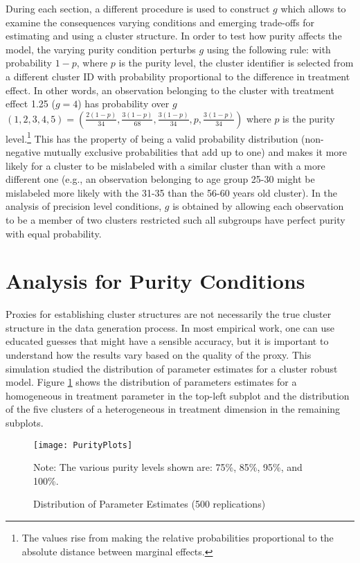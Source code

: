 \documentclass{jbsc}
\begin{document}
During each section, a different procedure is used to construct $g$ which allows to examine the consequences varying conditions and emerging trade-offs for estimating and using a cluster structure. In order to test how purity affects the model, the varying purity condition perturbs $g$ using the following rule: with probability $1 - p$, where $p$ is the purity level, the cluster identifier is selected from a different cluster ID with probability proportional to the difference in treatment effect. In other words, an observation belonging to the cluster with treatment effect 1.25 ($g = 4$) has probability over $g$ $\left(1,2,3,4,5\right) = \left(\frac{2(1 - p)}{34}, \frac{3(1 - p)}{68}, \frac{3(1 - p)}{34}, p, \frac{3(1 - p)}{34}\right)$ where $p$ is the purity level.\footnote{The values rise from making the relative probabilities proportional to the absolute distance between marginal effects.} This has the property of being a valid probability distribution (non-negative mutually exclusive probabilities that add up to one) and makes it more likely for a cluster to be mislabeled with a similar cluster than with a more different one (e.g., an observation belonging to age group 25-30 might be mislabeled more likely with the 31-35 than the 56-60 years old cluster). In the analysis of precision level conditions, $g$ is obtained by allowing each observation to be a member of two clusters restricted such all subgroups have perfect purity with equal probability.

\FloatBarrier
\section{Analysis for Purity Conditions}

Proxies for establishing cluster structures are not necessarily the true cluster structure in the data generation process. In most empirical work, one can use educated guesses that might have a sensible accuracy, but it is important to understand how the results vary based on the quality of the proxy. This simulation studied the distribution of parameter estimates for a cluster robust model. Figure \ref{PurityLevels} shows the distribution of parameters estimates for a homogeneous in treatment parameter in the top-left subplot and the distribution of the five clusters of a heterogeneous in treatment dimension in the remaining subplots.


\begin{figure}[hbpt]
	\texttt{[image: PurityPlots]}
	\caption{Distribution of Parameter Estimates (500 replications)}
	\label{PurityLevels}
	{\footnotesize Note: The various purity levels shown are: 75\%, 85\%, 95\%, and 100\%.}
\end{figure}
\end{document}

